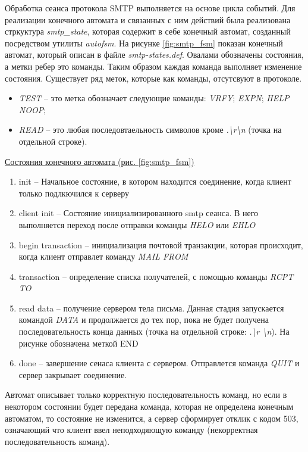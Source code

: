 \documentclass[a4paper,12pt]{report}
\begin{document}
    
    Обработка сеанса протокола SMTP выполняется на основе цикла событий. Для реализации конечного автомата и связанных с ним действий была реализована стркуктура \textit{smtp\_state}, которая содержит в себе конечный автомат, созданный посредством утилиты \textit{autofsm}. На рисунке \ref{fig:smtp_fsm} показан конечный автомат, который описан в файле \textit{smtp-states.def}. Овалами обозначены состояния, а метки ребер это команды. Таким образом каждая команда выполняет изменение состояния. Существует ряд меток, которые как команды, отсутсвуют в протоколе. 
    \begin{itemize}
        \item \textit{TEST} -- это метка обозначает следующие команды: \textit{VRFY}; \textit{EXPN}; \textit{HELP} \textit{NOOP}; 
        \item \textit{READ} -- это любая последовтаельность символов кроме \textit{.\textbackslash{}r\textbackslash{}n} (точка на отдельной строке).
    \end{itemize}
    
    \underline{Состояния конечного автомата (рис. \ref{fig:smtp_fsm})}
    \begin{enumerate}
        \item init -- Начальное состояние, в котором находится соединение, когда клиент только подлкючился к серверу
        \item client init -- Состояние инициализированного smtp сеанса. В него выполняется переход после отправки команды \textit{HELO} или \textit{EHLO}
        \item begin transaction -- инициализация почтовой транзакции, которая происходит, когда клиент отправлет команду \textit{MAIL FROM}
        \item transaction -- определение списка получателей, с помощью команды \textit{RCPT TO}
        \item  read data -- получение сервером тела письма. Данная стадия запускается командой \textit{DATA} и продолжается до тех пор, пока не будет получена последовательность конца данных (точка на отдельной строке: \textit{.\textbackslash{}r \textbackslash{}n}). На рисунке обозначена меткой END
        \item done -- завершение сенаса клиента с сервером. Отправлется команда \textit{QUIT} и сервер закрывает соединение.
    \end{enumerate}
    
    Автомат описывает только корректную последовательность команд, но если в некотором состоянии будет передана команда, которая не определена конечным автоматом, то состояние не изменится, а сервер сформирует отклик с кодом 503, означающий что клиент ввел неподходяющую команду (некорректная последовательность команд).
    
\end{document}
